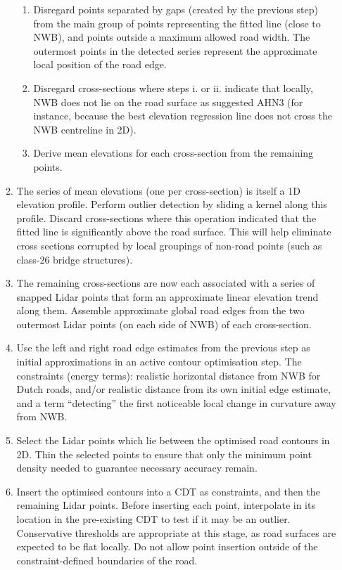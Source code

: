 \begin{enumerate}
\begin{enumerate}
\begin{enumerate}
                \item Disregard points separated by gaps (created by the previous step) from the main group of points representing the fitted line (close to NWB), and points outside a maximum allowed road width. The outermost points in the detected series represent the approximate local position of the road edge.
                \item Disregard cross-sections where steps i. or ii. indicate that locally, NWB does not lie on the road surface as suggested AHN3 (for instance, because the best elevation regression line does not cross the NWB centreline in 2D).
                \item Derive mean elevations for each cross-section from the remaining points.
            \end{enumerate}
            \item The series of mean elevations (one per cross-section) is itself a 1D elevation profile. Perform outlier detection by sliding a kernel along this profile. Discard cross-sections where this operation indicated that the fitted line is significantly above the road surface. This will help eliminate cross sections corrupted by local groupings of non-road points (such as class-26 bridge structures).
            \item The remaining cross-sections are now each associated with a series of snapped Lidar points that form an approximate linear elevation trend along them. Assemble approximate global road edges from the two outermost Lidar points (on each side of NWB) of each cross-section.
            \item Use the left and right road edge estimates from the previous step as initial approximations in an active contour optimisation step. The constraints (energy terms): realistic horizontal distance from NWB for Dutch roads, and/or realistic distance from its own initial edge estimate, and a term “detecting” the first noticeable local change in curvature away from NWB.
            \item Select the Lidar points which lie between the optimised road contours in 2D. Thin the selected points to ensure that only the minimum point density needed to guarantee necessary accuracy remain.
            \item Insert the optimised contours into a CDT as constraints, and then the remaining Lidar points. Before inserting each point, interpolate in its location in the pre-existing CDT to test if it may be an outlier. Conservative thresholds are appropriate at this stage, as road surfaces are expected to be flat locally. Do not allow point insertion outside of the constraint-defined boundaries of the road.

\end{enumerate}
\end{enumerate}
